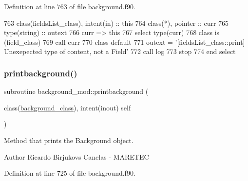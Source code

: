 Definition at line 763 of file background.\+f90.


\begin{DoxyCode}
763     \textcolor{keywordtype}{class}(fieldsList\_class), \textcolor{keywordtype}{intent(in)} :: this
764     \textcolor{keywordtype}{class}(*), \textcolor{keywordtype}{pointer} :: curr
765     \textcolor{keywordtype}{type}(string) :: outext
766     curr => this%
767     \textcolor{keywordflow}{select type}(curr)
768 \textcolor{keywordflow}{    class is} (field\_class)
769         \textcolor{keyword}{call }curr%
770 \textcolor{keywordflow}{        class default}
771         outext = \textcolor{stringliteral}{'[fieldsList\_class::print] Unexepected type of content, not a Field'}
772         \textcolor{keyword}{call }log%
773         stop
774 \textcolor{keywordflow}{    end select}
\end{DoxyCode}
\mbox{\label{namespacebackground__mod_a8a8f225cffcddb742f22a402155b703f}} 
\subsubsection{\texorpdfstring{printbackground()}{printbackground()}}
{\footnotesize\ttfamily subroutine background\+\_\+mod\+::printbackground (\begin{DoxyParamCaption}\item[{class(\mbox{\hyperlink{structbackground__mod_1_1background__class}{background\+\_\+class}}), intent(inout)}]{self }\end{DoxyParamCaption})\hspace{0.3cm}{\ttfamily [private]}}



Method that prints the Background object. 

\begin{DoxyAuthor}{Author}
Ricardo Birjukovs Canelas -\/ M\+A\+R\+E\+T\+EC 
\end{DoxyAuthor}


Definition at line 725 of file background.\+f90.


